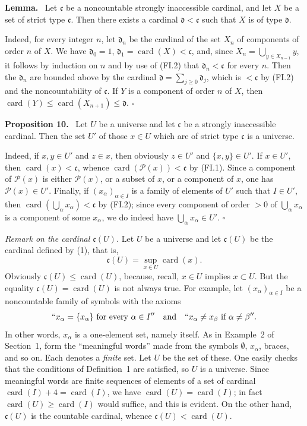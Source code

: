 \documentclass[11pt]{article}
\newcommand{\card}{\operatorname{card}}
\newcommand{\Pset}{\mathcal{P}}
\newcommand{\qedtext}{\hfill\(\square\)}
\newenvironment{statement}[1]{\par\medskip\noindent\textbf{#1.}\ }{\par\medskip}
\begin{document}
\begin{statement}{Lemma}
Let \(\mathfrak c\) be a noncountable strongly inaccessible cardinal, and let \(X\) be a set of strict type \(\mathfrak c\). Then there exists a cardinal \(\mathfrak d<\mathfrak c\) such that \(X\) is of type \(\mathfrak d\).
\end{statement}
Indeed, for every integer \(n\), let \(\mathfrak d_n\) be the cardinal of the set \(X_n\) of components of order \(n\) of \(X\). We have \(\mathfrak d_0=1\), \(\mathfrak d_1=\card(X)<\mathfrak c\), and, since \(X_n=\bigcup_{y\in X_{n-1}}y\), it follows by induction on \(n\) and by use of (FI.2) that \(\mathfrak d_n<\mathfrak c\) for every \(n\). Then the \(\mathfrak d_n\) are bounded above by the cardinal \(\mathfrak d=\sum_{j\geq0}\mathfrak d_j\), which is \(<\mathfrak c\) by (FI.2) and the noncountability of \(\mathfrak c\). If \(Y\) is a component of order \(n\) of \(X\), then \(\card(Y)\leq\card(X_{n+1})\leq\mathfrak d\). \qedtext

\begin{statement}{Proposition 10}
Let \(U\) be a universe and let \(\mathfrak c\) be a strongly inaccessible cardinal. Then the set \(U'\) of those \(x\in U\) which are of strict type \(\mathfrak c\) is a universe.
\end{statement}
Indeed, if \(x,y\in U'\) and \(z\in x\), then obviously \(z\in U'\) and \(\{x,y\}\in U'\). If \(x\in U'\), then \(\card(x)<\mathfrak c\), whence \(\card(\Pset(x))<\mathfrak c\) by (FI.1). Since a component of \(\Pset(x)\) is either \(\Pset(x)\), or a subset of \(x\), or a component of \(x\), one has \(\Pset(x)\in U'\). Finally, if \((x_\alpha)_{\alpha\in I}\) is a family of elements of \(U'\) such that \(I\in U'\), then \(\card(\bigcup_\alpha x_\alpha)<\mathfrak c\) by (FI.2); since every component of order \(>0\) of \(\bigcup_\alpha x_\alpha\) is a component of some \(x_\alpha\), we do indeed have \(\bigcup_\alpha x_\alpha\in U'\). \qedtext

\medskip
\noindent\emph{Remark on the cardinal \(\mathfrak c(U)\).} Let \(U\) be a universe and let \(\mathfrak c(U)\) be the cardinal defined by (1), that is,
\[
 \mathfrak c(U)=\sup_{x\in U}\card(x).
\]
Obviously \(\mathfrak c(U)\leq\card(U)\), because, recall, \(x\in U\) implies \(x\subset U\). But the equality \(\mathfrak c(U)=\card(U)\) is not always true. For example, let \((x_\alpha)_{\alpha\in I}\) be a noncountable family of symbols with the axioms
\[
 ``x_\alpha=\{x_\alpha\}\text{ for every }\alpha\in I''
 \quad\text{and}\quad
 ``x_\alpha\neq x_\beta\text{ if }\alpha\neq\beta''.
\]
In other words, \(x_\alpha\) is a one-element set, namely itself. As in Example~2 of Section~1, form the ``meaningful words'' made from the symbols \(\emptyset\), \(x_\alpha\), braces, and so on. Each denotes a \emph{finite} set. Let \(U\) be the set of these. One easily checks that the conditions of Definition~1 are satisfied, so \(U\) is a universe. Since meaningful words are finite sequences of elements of a set of cardinal \(\card(I)+4=\card(I)\), we have \(\card(U)=\card(I)\); in fact \(\card(U)\geq\card(I)\) would suffice, and this is evident. On the other hand, \(\mathfrak c(U)\) is the countable cardinal, whence \(\mathfrak c(U)<\card(U)\).
\end{document}
